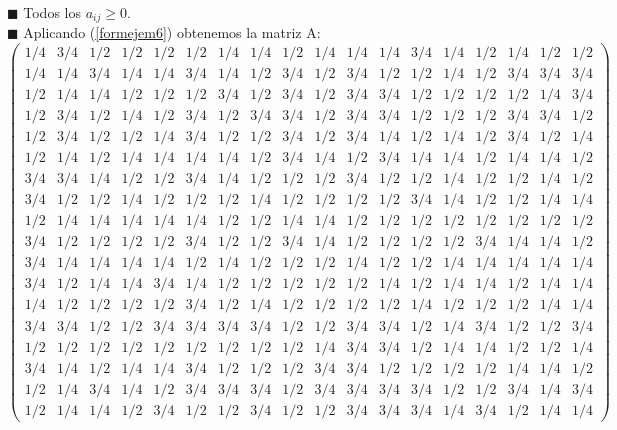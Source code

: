	
	$\blacksquare $ Todos los $a_{ij} \geqslant 0$.\\
	
	$\blacksquare $ Aplicando (\ref{formejem6}) obtenemos la matriz A:\\
{\tiny 	\[
	\left(\begin{array}{cccccccccccccccccc}
	 1/4 & 3/4 & 1/2 & 1/2 & 1/2 & 1/2 & 1/4 & 1/4 & 1/2 & 1/4 & 1/4 & 1/4 & 3/4 & 1/4 & 1/2 & 1/4 & 1/2 & 1/2 \\
	 1/4 & 1/4 & 3/4 & 1/4 & 1/4 & 3/4 & 1/4 & 1/2 & 3/4 & 1/2 & 3/4 & 1/2 & 1/2 & 1/4 & 1/2 & 3/4 & 3/4 & 3/4 \\
	 1/2 & 1/4 & 1/4 & 1/2 & 1/2 & 1/2 & 3/4 & 1/2 & 3/4 & 1/2 & 3/4 & 3/4 & 1/2 & 1/2 & 1/2 & 1/2 & 1/4 & 3/4 \\
	 1/2 & 3/4 & 1/2 & 1/4 & 1/2 & 3/4 & 1/2 & 3/4 & 3/4 & 1/2 & 3/4 & 3/4 & 1/2 & 1/2 & 1/2 & 3/4 & 3/4 & 1/2 \\
	 1/2 & 3/4 & 1/2 & 1/2 & 1/4 & 3/4 & 1/2 & 1/2 & 3/4 & 1/2 & 3/4 & 1/4 & 1/2 & 1/4 & 1/2 & 3/4 & 1/2 & 1/4 \\
	 1/2 & 1/4 & 1/2 & 1/4 & 1/4 & 1/4 & 1/4 & 1/2 & 3/4 & 1/4 & 1/2 & 3/4 & 1/4 & 1/4 & 1/2 & 1/4 & 1/4 & 1/2 \\
	 3/4 & 3/4 & 1/4 & 1/2 & 1/2 & 3/4 & 1/4 & 1/2 & 1/2 & 1/2 & 3/4 & 1/2 & 1/2 & 1/4 & 1/2 & 1/2 & 1/4 & 1/2 \\
	 3/4 & 1/2 & 1/2 & 1/4 & 1/2 & 1/2 & 1/2 & 1/4 & 1/2 & 1/2 & 1/2 & 1/2 & 3/4 & 1/4 & 1/2 & 1/2 & 1/4 & 1/4 \\
	 1/2 & 1/4 & 1/4 & 1/4 & 1/4 & 1/4 & 1/2 & 1/2 & 1/4 & 1/4 & 1/2 & 1/2 & 1/2 & 1/2 & 1/2 & 1/2 & 1/2 & 1/2 \\
	 3/4 & 1/2 & 1/2 & 1/2 & 1/2 & 3/4 & 1/2 & 1/2 & 3/4 & 1/4 & 1/2 & 1/2 & 1/2 & 1/2 & 3/4 & 1/4 & 1/4 & 1/2 \\
	 3/4 & 1/4 & 1/4 & 1/4 & 1/4 & 1/2 & 1/4 & 1/2 & 1/2 & 1/2 & 1/4 & 1/2 & 1/2 & 1/4 & 1/4 & 1/4 & 1/4 & 1/4 \\
	 3/4 & 1/2 & 1/4 & 1/4 & 3/4 & 1/4 & 1/2 & 1/2 & 1/2 & 1/2 & 1/2 & 1/4 & 1/2 & 1/4 & 1/4 & 1/2 & 1/4 & 1/4 \\
	 1/4 & 1/2 & 1/2 & 1/2 & 1/2 & 3/4 & 1/2 & 1/4 & 1/2 & 1/2 & 1/2 & 1/2 & 1/4 & 1/2 & 1/2 & 1/2 & 1/4 & 1/4 \\
	 3/4 & 3/4 & 1/2 & 1/2 & 3/4 & 3/4 & 3/4 & 3/4 & 1/2 & 1/2 & 3/4 & 3/4 & 1/2 & 1/4 & 3/4 & 1/2 & 1/2 & 3/4 \\
	 1/2 & 1/2 & 1/2 & 1/2 & 1/2 & 1/2 & 1/2 & 1/2 & 1/2 & 1/4 & 3/4 & 3/4 & 1/2 & 1/4 & 1/4 & 1/2 & 1/2 & 1/4 \\
	 3/4 & 1/4 & 1/2 & 1/4 & 1/4 & 3/4 & 1/2 & 1/2 & 1/2 & 3/4 & 3/4 & 1/2 & 1/2 & 1/2 & 1/2 & 1/4 & 1/4 & 1/2 \\
	 1/2 & 1/4 & 3/4 & 1/4 & 1/2 & 3/4 & 3/4 & 3/4 & 1/2 & 3/4 & 3/4 & 3/4 & 3/4 & 1/2 & 1/2 & 3/4 & 1/4 & 3/4 \\
	 1/2 & 1/4 & 1/4 & 1/2 & 3/4 & 1/2 & 1/2 & 3/4 & 1/2 & 1/2 & 3/4 & 3/4 & 3/4 & 1/4 & 3/4 & 1/2 & 1/4 & 1/4 	
	 \end{array} \right) 
	\]}
	
